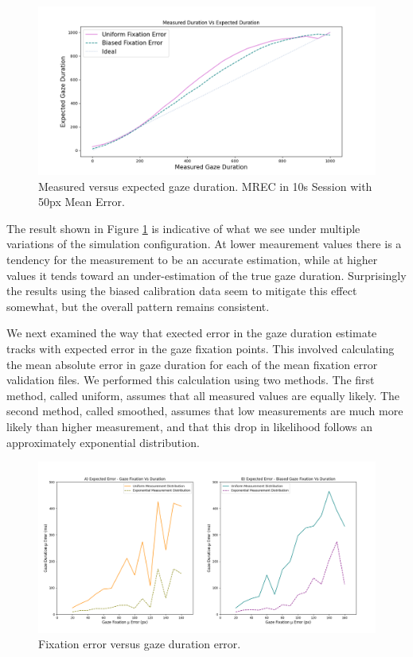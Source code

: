 \documentclass[12pt,a4paper]{article}
\numberwithin{equation}{section}
\begin{document}
\begin{figure}[h!]
\includegraphics[scale=0.5]{../results/Measured_vs_expected.png}
\caption{Measured versus expected gaze duration. MREC in 10s Session with 50px Mean Error.}
\label{fig:measured_vs_expected}
\end{figure}

The result shown in Figure \ref{fig:measured_vs_expected} is indicative of what we see under
multiple variations of the simulation configuration. At lower meaurement values there is a 
tendency for the measurement to be an accurate estimation, while at higher values it tends
toward an under-estimation of the true gaze duration. Surprisingly the results using the
biased calibration data seem to mitigate this effect somewhat, but the overall pattern 
remains consistent.

We next examined the way that exected error in the gaze duration estimate tracks with expected 
error in the gaze fixation points. This involved calculating the mean absolute error in gaze
duration for each of the mean fixation error validation files. We performed this calculation
using two methods. The first method, called uniform, assumes that all measured values are 
equally likely. The second method, called smoothed, assumes that low measurements are much
more likely than higher measurement, and that this drop in likelihood follows an approximately
exponential distribution.

\begin{figure}[h!]
\centering
\includegraphics[scale=0.4]{../results/Fixation_vs_duration_error.png}
\caption{Fixation error versus gaze duration error.}
\label{fig:fixation_vs_duration}
\end{figure}
\end{document}
